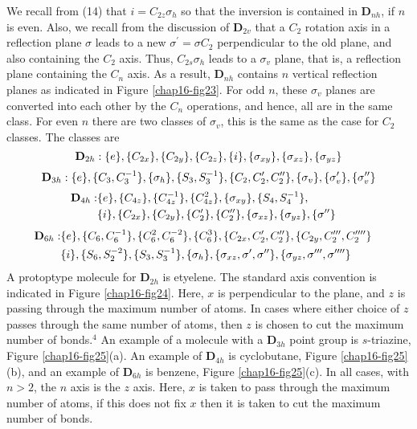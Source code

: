 We recall from (14) that $i = C_{2z} \sigma_h$ so that the inversion
is contained in {\bf D}$_{nh}$, if $n$ is even.  Also, we recall from
the discussion of {\bf D}$_{2v}$ that a $C_2$ rotation axis in a
reflection plane $\sigma$ leads to a new $\sigma^{\prime} = \sigma
C_2$ perpendicular to the old plane, and also containing the $C_2$
axis.  Thus, $C_{2s}\sigma_h$ leads to a $\sigma_v$ plane, that is, a
reflection plane containing the $C_n$ axis.  As a result, {\bf
D}$_{nh}$ contains $n$ vertical reflection planes as indicated in
Figure \ref{chap16-fig23}.  For odd $n$, these $\sigma_v$ planes are
converted into each other by the $C_n$ operations, and hence, all are
in the same class.  For even $n$ there are two classes of $\sigma_v$,
this is the same as the case for $C_2$ classes.  The classes are
\begin{equation}
{\rm{\bf{D}}}_{2h} : \{e\} , \{C_{2x} \}, \{C_{2y}\}, \{C_{2z}\}, \{ i 
\}, \{ \sigma_{xy} \}, \{ \sigma_{xz} \} , \{\sigma_{yz}\}
\end{equation}
\begin{equation}
{\rm{\bf{D}}}_{3h} : \{e\} , \{C_3 , C_3^{-1}\} , \{ \sigma_h \} , \{ S_3, 
S_3^{-1}\} , \{C_2 , C_2^{\prime} , C_2^{\prime \prime} \} , \{ 
\sigma_v \} , \{ \sigma_v^{\prime} \} , \{ \sigma_v^{\prime \prime} 
\}
\end{equation}
\begin{eqnarray}
{\rm{\bf{D}}}_{4h} : & \{e\} , \{C_{4z} \} , \{ C_{4z}^{-1}\} , 
\{C^2_{4z}\} , \{ \sigma_{xy} \} , \{S_4, S_4^{-1}\},\cr
& \{ i\}, \{C_{2x}\} , \{C_{2y}\} , \{ C_2^{\prime}\} , \{ C^{\prime 
\prime}_2 \} , \{ \sigma_{xz} \} , \{ \sigma_{yz} \}, \{ 
\sigma^{\prime \prime} \}
\end{eqnarray}
\begin{eqnarray}
{\rm{\bf{D}}}_{6h} : & \{e\} , \{C_6 , C_6^{-1} \} , \{ C_6^2 , 
C_6^{-2} \} , \{C^3_6 \} , \{C_{2x} , C_2^{\prime} , C_2^{\prime 
\prime} \} , \{C_{2y} , C_2^{\prime \prime \prime} , C_2^{\prime 
\prime \prime \prime}\}\cr
& \{ i \}, \{S_6, S_2^{-2}\} , \{S_3 , S_3^{-1}\} , \{ \sigma_h \}, \{ 
\sigma_{xz} , \sigma^{\prime} , \sigma^{\prime \prime} \} , \{ 
\sigma_{yz} , \sigma^{\prime \prime \prime} , \sigma^{\prime \prime 
\prime \prime}\}
\end{eqnarray}
A protoptype molecule for {\bf D}$_{2h}$ is etyelene.  The standard
axis convention is indicated in Figure \ref{chap16-fig24}.  Here, $x$
is perpendicular to the plane, and $z$ is passing through the maximum
number of atoms. In cases where either choice of $z$ passes through
the same number of atoms, then $z$ is chosen to cut the maximum number
of bonds.$^4$ An example of a molecule with a {\bf D}$_{3h}$ point
group is $s$-triazine, Figure \ref{chap16-fig25}(a).  An example of
{\bf D}$_{4h}$ is cyclobutane, Figure \ref{chap16-fig25}(b), and an
example of {\bf D}$_{6h}$ is benzene, Figure \ref{chap16-fig25}(c).
In all cases, with $n > 2$, the $n$ axis is the $z$ axis.  Here, $x$
is taken to pass through the maximum number of atoms, if this does not
fix $x$ then it is taken to cut the maximum number of bonds.

